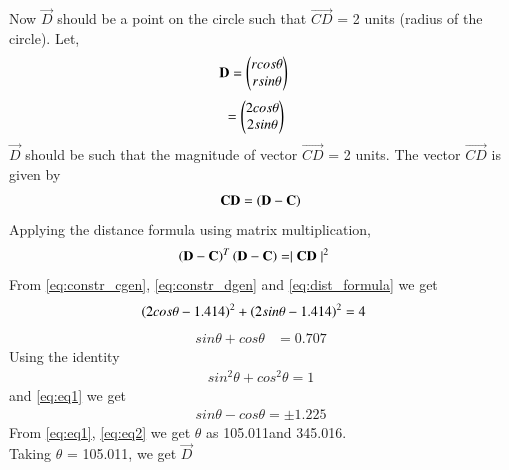 \begin{enumerate}[label=\thesection.\arabic*.,ref=\thesection.\theenumi]
Now $\vec{D}$ should be a point on the circle such that $\vec{CD}$ = 2 units (radius of the circle).
Let,
\begin{align}
\mathbf{D} & = \begin{pmatrix}rcos\theta\\rsin\theta\end{pmatrix} 
\end{align}
\begin{align}
  & = \begin{pmatrix}2cos\theta\\2sin\theta\end{pmatrix}
\label{eq:constr_dgen}
\end{align}
$\vec{D}$ should be such that the magnitude of vector $\vec{CD}$ = 2 units. The vector $\vec{CD}$ is given by 
\begin{align}
\mathbf{CD} = \left(\mathbf{D} - \mathbf{C}\right)
\end{align}
Applying the distance formula using matrix multiplication,
\begin{align}
\left(\mathbf{D} - \mathbf{C}\right)^T\left(\mathbf{D} - \mathbf{C}\right) &=  \mid\mathbf{CD}\mid ^2
 \label{eq:dist_formula}
\end{align}
 From  \eqref{eq:constr_cgen}, \eqref{eq:constr_dgen} and \eqref{eq:dist_formula} we get 
\begin{align}
 \left(2cos \theta - 1.414\right)^2 +  \left(2sin \theta - 1.414\right)^2 &= 4 
\end{align}
\begin{align}
 sin \theta + cos \theta &= 0.707
  \label{eq:eq1}
\end{align}
Using the identity
 \begin{align}
   sin^2 \theta + cos^2 \theta = 1
 \end{align}
 and  \eqref{eq:eq1} we get
  \begin{align}
  sin\theta - cos\theta =  \pm 1.225
  \label{eq:eq2}
  \end{align}
 From \eqref{eq:eq1}, \eqref{eq:eq2} we get $\theta$ as 105.011\degree and 345.016\degree.\\
 Taking $\theta$ = 105.011\degree, we get $\vec{D}$


\end{enumerate}

